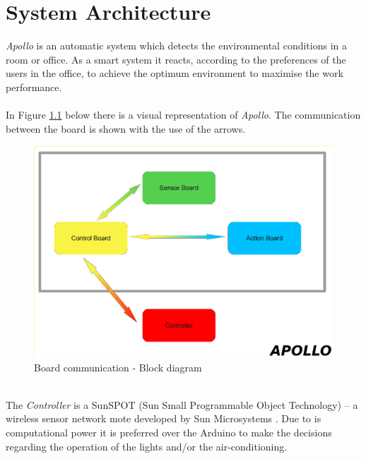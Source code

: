 \documentclass[12pt,a4paper,draft]{report}
\begin{document}
\chapter{System Architecture}
%
\emph{Apollo} is an automatic system which detects the environmental conditions in a room or office.
As a smart system it reacts, according to the preferences of the users in the office, to achieve the optimum environment to maximise the work performance.\\
\ \\
In Figure \ref{arch_design} below there is a visual representation of \emph{Apollo}. The communication between the board is shown with the use of the arrows.\\
%
\begin{figure}[H]
\centering
\includegraphics*[scale=0.35]{architecture_design}
\caption{Board communication - Block diagram}
\label{arch_design}
\end{figure}
\ \\
The \textit{Controller} is a SunSPOT (Sun Small Programmable Object Technology) -- a wireless sensor network mote developed by Sun Microsystems \cite{website:sunspot}. 
Due to is computational power it is preferred over the Arduino to make the decisions regarding the operation of the lights and/or the air-conditioning.\label{Controller} \\ 
\ \\
\end{document}
